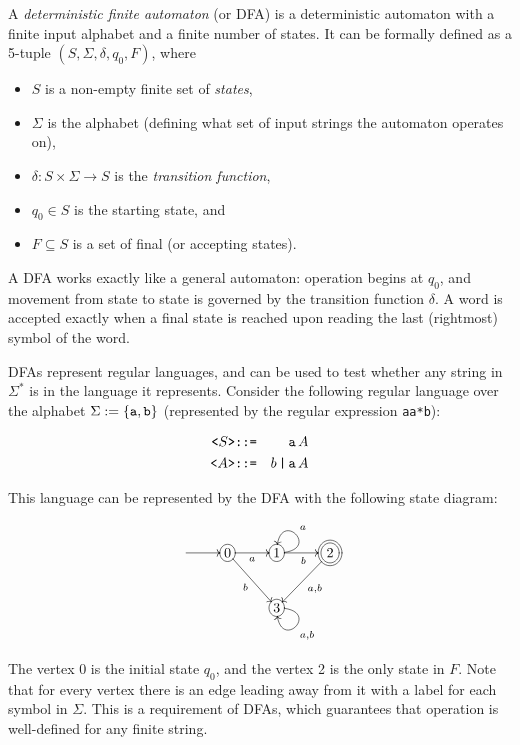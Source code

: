 \documentclass[12pt]{article}
\begin{document}
A \emph{deterministic finite automaton} (or DFA) is a deterministic automaton with a finite input alphabet and a finite number of states.  It can be formally defined as a 5-tuple
$(S, \Sigma, \delta, q_0, F)$, where 
\begin{itemize}
\item $S$ is a non-empty finite set of \emph{states}, 
\item $\Sigma$ is the alphabet (defining what set of input strings the automaton operates on), 
\item $\delta : S\times\Sigma\rightarrow S$ is the \emph{transition function},
\item $q_0 \in S$ is the starting state, and 
\item $F \subseteq S$ is a set of final (or accepting states).  
\end{itemize}
A DFA works exactly like a general automaton: operation begins at $q_0$, and movement from state to state is governed by the transition function $\delta$.  A word is accepted exactly when a final state is reached upon reading the last (rightmost) symbol of the word.

DFAs represent regular languages, and can be used to test whether any string in $\Sigma^*$ is in the language it represents.  Consider the following regular language over the alphabet $\Sigma := \left\{ \verb.a., \verb.b. \right\}$ (represented by the regular expression \verb=aa*b=):

\begin{eqnarray*}
\verb.<.S\verb.>. & \verb.::=. & \verb=a=\,A \\
\verb.<.A\verb.>. & \verb.::=. & b\,\verb.|.\,\verb=a=\,A \\
\end{eqnarray*}

This language can be represented by the DFA with the following state diagram:

$$
\UseComputerModernTips
\xymatrix {
    \ar[r] &
        *+[o][F-]{0} \ar[r]_a \ar[rd]_b &
        *+[o][F-]{1} \ar@(r,u)[]_a \ar[r]_b &
        *++[o][F=]{2} \ar[dl]^{a,b}
    \\
        &&
        *+[o][F-]{3} \ar@(r,d)[]^{a,b}
}
$$

The vertex 0 is the initial state $q_0$, and the vertex 2 is the only state in $F$.  Note that for every vertex there is an edge leading away from it with a label for each symbol in $\Sigma$.  This is a requirement of DFAs, which guarantees that operation is well-defined for any finite string.
\end{document}
